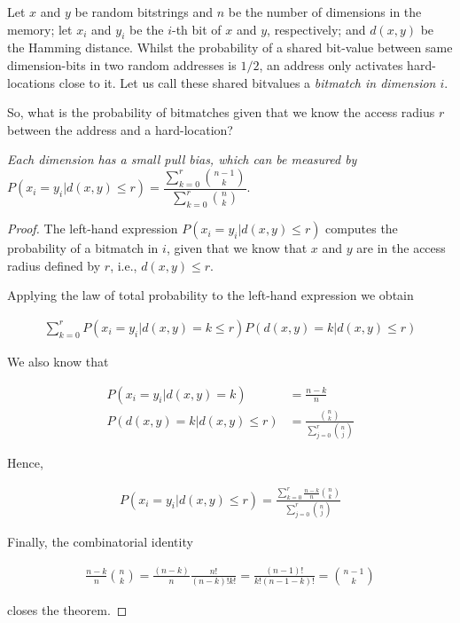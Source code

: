 Let $x$ and $y$ be random bitstrings and $n$ be the number of dimensions in the memory; let $x_i$ and $y_i$ be the $i$-th bit of $x$ and $y$, respectively; and $d(x, y)$ be the Hamming distance. Whilst the probability of a shared bit-value between same dimension-bits in two random addresses is $1/2$, an address only activates hard-locations close to it.  Let us call these shared bitvalues a \emph{bitmatch in dimension $i$}.

So, what is the probability of bitmatches given that we know the access radius $r$ between the address and a hard-location?
\bigskip

\begin{theorem}
\emph{Each dimension has a small pull bias, which can be measured by}
\label{T1}
$P(x_i = y_i | d(x, y) \le r) = \dfrac{\sum_{k=0}^{r} \binom{n-1}{k}}{\sum_{k=0}^{r} \binom{n}{k}}.$
\end{theorem}

\begin{proof}
    The left-hand expression $P(x_i = y_i | d(x, y) \le r)$ computes the probability of a bitmatch in $i$, given that we know that $x$ and $y$ are in the access radius defined by $r$, i.e., $d(x, y)\le r$.

    Applying the law of total probability to the left-hand expression we obtain

    \begin{align}
    \sum_{k=0}^{r} P(x_i = y_i | d(x, y) = k \le r) P(d(x, y) = k | d(x, y) \le r)
    \end{align}

    We also know that

    \begin{align}
    P(x_i = y_i | d(x, y) = k) &= \frac{n-k}{n} \\
    P(d(x, y) = k | d(x, y) \le r) &= \frac{\binom{n}{k}}{\sum_{j=0}^{r} \binom{n}{j}}
    \end{align}

    Hence,

    \begin{align}
    P(x_i = y_i | d(x, y) \le r) = \frac{\sum_{k=0}^{r} \frac{n-k}{n} \binom{n}{k}}{\sum_{j=0}^{r} \binom{n}{j}}
    \end{align}

    Finally, the combinatorial identity

    \begin{align}
    \frac{n-k}{n} \binom{n}{k} = \frac{(n-k)}{n} \frac{n!}{(n-k)! k!} = \frac{(n-1)!}{k! (n-1-k)!} = \binom{n-1}{k}
    \end{align}

    closes the theorem.

\end{proof}

